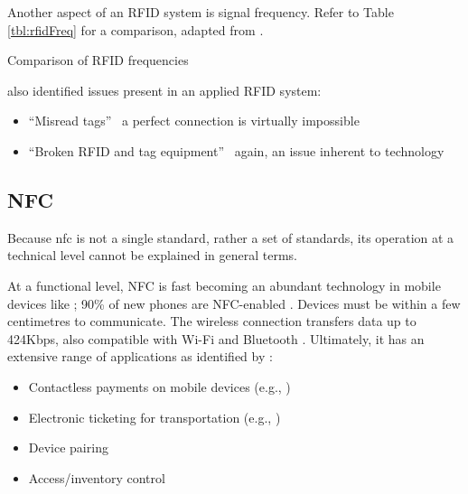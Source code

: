 Another aspect of an RFID system is signal frequency.
Refer to Table \ref{tbl:rfidFreq} for a comparison, adapted
from \cite{whatIsRfid}.

\begin{table}[ht]
  \centering
  
  \caption{Comparison of RFID frequencies}
  \label{tbl:rfidFreq}
\end{table}

\cite{barcodeRfidComparison} also identified issues present
in an applied RFID system:

\begin{itemize}

  \item \enquote{Misread tags} \textemdash~a perfect
        connection is virtually impossible

  \item \enquote{Broken RFID and tag equipment}
        \textemdash~again, an issue inherent to technology

\end{itemize}

\subsection{NFC} \label{ss:nfc}

Because \gls{nfc} is not a single standard, rather a set of
standards, its operation at a technical level cannot be
explained in general terms.


At a functional level, NFC is fast becoming an abundant
technology in mobile devices like
; 90\% of new phones
are NFC-enabled \parencite{nfcHandsetStats}. Devices must be
within a few centimetres to communicate. The wireless
connection transfers data up to 424Kbps, also compatible 
with Wi-Fi and Bluetooth \parencite{nfc}. Ultimately, it has
an extensive range of applications as identified by 
\cite{nfc}: 

\begin{itemize}
  \item Contactless payments on mobile devices
        (e.g., \cite{androidPayWithPhone, applePay})
  \item Electronic ticketing for transportation
        (e.g., \cite{digitalTickets})
  \item Device pairing
  \item Access/inventory control
\end{itemize}


